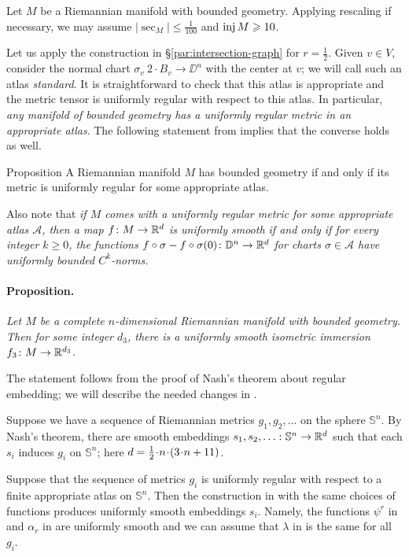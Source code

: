 \documentclass[a4paper,10pt]{article}
\begin{document}
Let $M$ be a Riemannian manifold with bounded geometry.
Applying rescaling if necessary, we may assume $|\sec_M|\le \tfrac1{100}$ and $\operatorname{\rm inj} M\geqslant 10$.

Let us apply the construction in §\ref{par:intersection-graph} for $r=\tfrac12$.
Given $v\in V$, consider the normal chart $\sigma_v\:2\cdot B_v\to\DD^n$ with the center at $v$;
we will call such an atlas \emph{standard}.
It is straightforward to check that this atlas is appropriate and
the metric tensor is uniformly regular with respect to this atlas.
In particular, \textit{any manifold of bounded geometry has a uniformly regular metric in an appropriate atlas}.
The following statement from \cite{disconzi-shao-simonett} implies that the converse holds as well.

\begin{thm}{Proposition}
A Riemannian manifold $M$ has bounded geometry if and only if its metric is uniformly regular for some appropriate atlas.
\end{thm}

Also note that \textit{if $M$ comes with a uniformly regular metric for some appropriate atlas $\mathcal{A}$,
then a map $f\colon M\to \mathbb{R}^d$ is uniformly smooth if and only if for every integer $k\ge 0$,
the functions $f\circ\sigma-f\circ\sigma(0)\colon \mathbb{D}^n\to \mathbb{R}^d$ for charts $\sigma\in \mathcal{A}$
have uniformly bounded $C^k$-norms.}


\paragraph{Proposition.}\label{par:nash}
\textit{Let $M$ be a complete $n$-dimensional Riemannian manifold with bounded geometry.
Then for some integer $d_3$, there is a uniformly smooth isometric immersion $f_3\colon M\to\mathbb{R}^{d_3}$.}

\medskip

The statement follows from the proof of Nash's theorem about regular embedding;
we will describe the needed changes in \cite{nash}.

Suppose we have a sequence of Riemannian metrics $g_1,g_2,\dots $ on the sphere $\mathbb{S}^n$.
By Nash's theorem, there are smooth embeddings $s_1,s_2,\z\dots\:\mathbb{S}^n\to \RR^d$
such that each $s_i$ induces $g_i$ on $\mathbb{S}^n$; here $d\z=\tfrac12\cdot n\cdot(3\cdot n+11)$.

Suppose that the sequence of metrics $g_i$ is uniformly regular with respect to a finite appropriate atlas on $\mathbb{S}^n$.
Then the construction in \cite[Part C]{nash} with the same choices of functions produces uniformly smooth embeddings $s_i$.
Namely, the functions $\psi^r$ in \cite[(C2)]{nash} and $\alpha_r$ in \cite[(C10)]{nash} are uniformly smooth and we can assume that $\lambda$ in \cite[(C12)]{nash} is the same for all $g_i$. 
\end{document}
